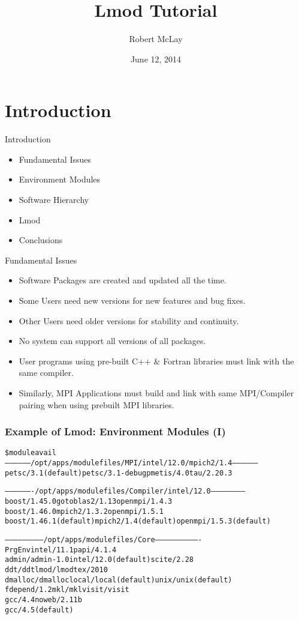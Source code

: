 \documentclass{beamer}
\title{Lmod Tutorial}
\author{Robert McLay}
\institute{The Texas Advanced Computing Center}
\date{June 12, 2014}  %
\begin{document}
\begin{frame}
  \titlepage
\end{frame}

\section{Introduction}

\begin{frame}{Introduction}
  \begin{itemize}
    \item Fundamental Issues
    \item Environment Modules
    \item Software Hierarchy
    \item Lmod
    \item Conclusions
  \end{itemize}
\end{frame}


\begin{frame}{Fundamental Issues}
  \begin{itemize}
    \item Software Packages are created and updated all the time.
    \item Some Users need new versions for new features and bug fixes.
    \item Other Users need older versions for stability and continuity.
    \item No system can support all versions of all packages.
    \item User programs using pre-built C++ \& Fortran libraries must
      link with the same compiler.
    \item Similarly, MPI Applications must build and link with same
      MPI/Compiler pairing when using prebuilt MPI libraries.
  \end{itemize}
\end{frame}

\begin{frame}[fragile]
    \frametitle{Example of Lmod: Environment Modules (I)}
    {\tiny
\begin{alltt}
\$ {\color{blue} module avail}
------------------ /opt/apps/modulefiles/MPI/intel/12.0/mpich2/1.4 ------------------
  petsc/3.1 (default)    petsc/3.1-debug    pmetis/4.0    tau/2.20.3

------------------- /opt/apps/modulefiles/Compiler/intel/12.0 -----------------------
  boost/1.45.0              gotoblas2/1.13          openmpi/1.4.3
  boost/1.46.0              mpich2/1.3.2            openmpi/1.5.1
  boost/1.46.1 (default)    mpich2/1.4 (default)    openmpi/1.5.3 (default)

-------------------------- /opt/apps/modulefiles/Core -------------------------------
  PrgEnv               intel/11.1               papi/4.1.4
  admin/admin-1.0      intel/12.0 (default)     scite/2.28
  ddt/ddt              lmod/lmod                tex/2010
  dmalloc/dmalloc      local/local (default)    unix/unix (default)
  fdepend/1.2          mkl/mkl                  visit/visit
  gcc/4.4              noweb/2.11b
  gcc/4.5 (default)
\end{alltt}
    }
\end{frame}
\end{document}
